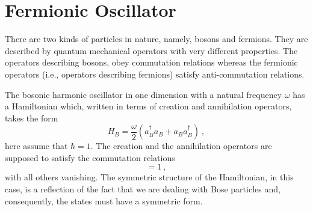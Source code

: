 \documentclass[11pt,a4paper]{article}
\begin{document}
\section{Fermionic Oscillator}
\cite{das2006field}  There are two kinds of particles in nature, namely, bosons and fermions. They are described by quantum mechanical operators with very different properties. The operators describing bosons, obey commutation relations whereas the fermionic operators (i.e., operators describing fermions) satisfy anti-commutation relations.

The bosonic harmonic oscillator in one dimension with a natural frequency $\omega$ has a Hamiltonian which, written in terms of creation and annihilation operators, takes the form
\begin{equation}
H_B = \dfrac{\omega}{2} \left(a_B^\dagger a_B +a_B a_B^\dagger \right) ~,
\end{equation}
here assume that $\hbar = 1$. The creation and the annihilation operators are supposed to satisfy the commutation
relations
\begin{equation}
[a_B, a_B^\dagger] = 1 ~,
\end{equation}
with all others vanishing. The symmetric structure of the Hamiltonian, in this case, is a reflection of the fact that we are dealing with Bose particles and, consequently, the states must have a symmetric form.
\end{document}
